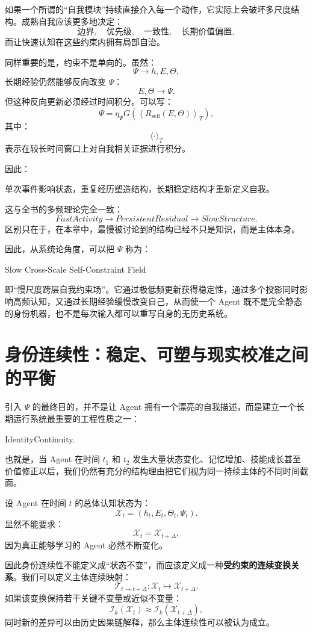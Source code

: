 如果一个所谓的“自我模块”持续直接介入每一个动作，它实际上会破坏多尺度结构。成熟自我应该更多地决定：
\[
\text{边界},
\quad
\text{优先级},
\quad
\text{一致性},
\quad
\text{长期价值偏置},
\]
而让快速认知在这些约束内拥有局部自治。

同样重要的是，约束不是单向的。虽然：
\[
\Psi
\rightarrow
h,E,\Theta,
\]
长期经验仍然能够反向改变 $\Psi$：
\[
E,\Theta
\rightarrow
\Psi.
\]
但这种反向更新必须经过时间积分。可以写：
\[
\dot\Psi
=
\eta_\Psi
G
\left(
\left\langle
R_{\mathrm{self}}(E,\Theta)
\right\rangle_T
\right),
\]
其中：
\[
\langle\cdot\rangle_T
\]
表示在较长时间窗口上对自我相关证据进行积分。

因此：
\begin{statementbox}
单次事件影响状态，重复经历塑造结构，长期稳定结构才重新定义自我。
\end{statementbox}

这与全书的多频理论完全一致：
\[
FastActivity
\rightarrow
PersistentResidual
\rightarrow
SlowStructure.
\]
区别只在于，在本章中，最慢被讨论到的结构已经不只是知识，而是主体本身。

因此，从系统论角度，可以把 $\Psi$ 称为：
\begin{statementbox}
Slow Cross-Scale Self-Constraint Field
\end{statementbox}
即“慢尺度跨层自我约束场”。它通过极低频更新获得稳定性，通过多个投影同时影响高频认知，又通过长期经验缓慢改变自己，从而使一个 Agent 既不是完全静态的身份机器，也不是每次输入都可以重写自身的无历史系统。


\section{身份连续性：稳定、可塑与现实校准之间的平衡}

引入 $\Psi$ 的最终目的，并不是让 Agent 拥有一个漂亮的自我描述，而是建立一个长期运行系统最重要的工程性质之一：
\begin{statementbox}
IdentityContinuity.
\end{statementbox}
也就是，当 Agent 在时间 $t_1$ 和 $t_2$ 发生大量状态变化、记忆增加、技能成长甚至价值修正以后，我们仍然有充分的结构理由把它们视为同一持续主体的不同时间截面。

设 Agent 在时间 $t$ 的总体认知状态为：
\[
\mathcal X_t
=
(h_t,E_t,\Theta_t,\Psi_t).
\]
显然不能要求：
\[
\mathcal X_t
=
\mathcal X_{t+\Delta},
\]
因为真正能够学习的 Agent 必然不断变化。

因此身份连续性不能定义成“状态不变”，而应该定义成一种\textbf{受约束的连续变换关系}。我们可以定义主体连续映射：
\[
\mathcal T_{t\rightarrow t+\Delta}:
\mathcal X_t
\mapsto
\mathcal X_{t+\Delta}.
\]
如果该变换保持若干关键不变量或近似不变量：
\[
\mathcal I_k(\mathcal X_t)
\approx
\mathcal I_k(\mathcal X_{t+\Delta}),
\]
同时新的差异可以由历史因果链解释，那么主体连续性可以被认为成立。

